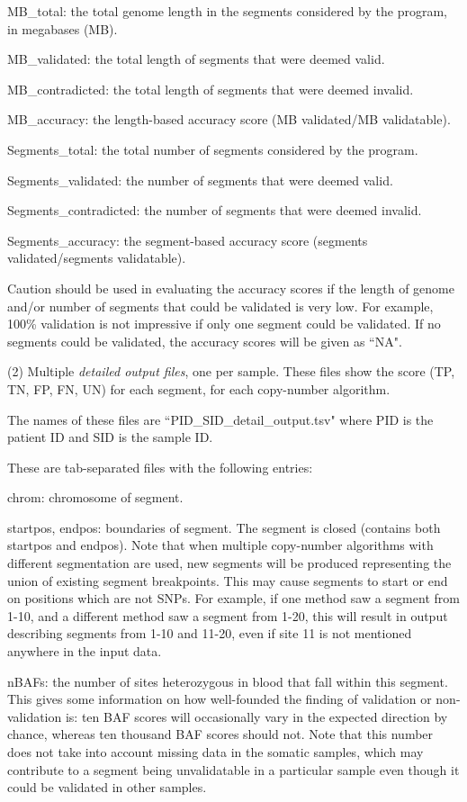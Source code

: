 \documentclass{article}
\begin{document}
MB\_total:  the total genome length in the segments considered
by the program, in megabases (MB).

MB\_validated:  the total length of segments that were deemed
valid.

MB\_contradicted:  the total length of segments that were deemed
invalid.

MB\_accuracy:  the length-based accuracy score (MB validated/MB validatable).

Segments\_total:  the total number of segments considered by the
program.

Segments\_validated:  the number of segments that were deemed
valid.

Segments\_contradicted:  the number of segments that were deemed
invalid.

Segments\_accuracy:  the segment-based accuracy score (segments 
validated/segments validatable).

Caution should be used in evaluating the accuracy scores if the
length of genome and/or number of segments that could be validated
is very low.  For example, 100\% validation is not impressive if
only one segment could be validated.  If no segments could be
validated, the accuracy scores will be given as ``NA".

(2)  Multiple {\it detailed output files}, one per sample.  These
files show the score (TP, TN, FP, FN, UN) for each segment, for
each copy-number algorithm.

The names of these files are ``PID\_SID\_detail\_output.tsv" where
PID is the patient ID and SID is the sample ID.

These are tab-separated files with the following entries:

chrom:  chromosome of segment.

startpos, endpos:  boundaries of segment.  The segment is closed (contains
both startpos and endpos).  Note that when multiple copy-number
algorithms with different segmentation are used, new segments will
be produced representing the union of existing segment breakpoints.
This may cause segments to start or end on positions which are
not SNPs.  For example, if one method saw a segment from 1-10,
and a different method saw a segment from 1-20, this will result
in output describing segments from 1-10 and 11-20, even if site 11 is
not mentioned anywhere in the input data.

nBAFs:  the number of sites heterozygous in blood that fall within this
segment.  This gives some information on how well-founded the finding of
validation or non-validation is:  ten BAF scores will occasionally vary in the
expected direction by chance, whereas ten thousand BAF scores should not.
Note that this number does not
take into account missing data in the somatic samples, which may
contribute to a segment being unvalidatable in a particular sample
even though it could be validated in other samples.
\end{document}
